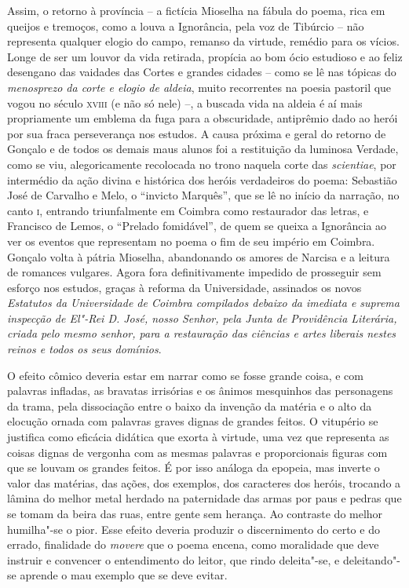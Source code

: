 Assim, o retorno à província -- a fictícia Mioselha na fábula do poema, rica em
queijos e tremoços, como a louva a Ignorância, pela voz de Tibúrcio -- não
representa qualquer elogio do campo, remanso da virtude, remédio para os vícios.
Longe de ser um louvor da vida retirada, propícia ao bom ócio estudioso e ao
feliz desengano das vaidades das Cortes e grandes cidades -- como se lê nas
tópicas do \textit{menosprezo da corte e elogio de aldeia}, muito recorrentes na
poesia pastoril que vogou no século \textsc{xviii} (e não só nele) --, a buscada
vida na aldeia é aí mais propriamente um emblema da fuga para a obscuridade,
antiprêmio dado ao herói por sua fraca perseverança nos estudos. A causa próxima
e geral do retorno de Gonçalo e de todos os demais maus alunos foi a restituição
da luminosa Verdade, como se viu, alegoricamente recolocada no trono naquela
corte das \textit{scientiae}, por intermédio da ação divina e histórica dos
heróis verdadeiros do poema: Sebastião José de Carvalho e Melo, o ``invicto
Marquês'', que se lê no início da narração, no canto \textsc{i}, entrando
triunfalmente em Coimbra como restaurador das letras, e Francisco de Lemos, o
``Prelado fomidável'', de quem se queixa a Ignorância ao ver os eventos que
representam no poema o fim de seu império em Coimbra.  Gonçalo volta à pátria
Mioselha, abandonando os amores de Narcisa e a leitura de romances vulgares.
Agora fora definitivamente impedido de prosseguir sem esforço nos estudos,
graças à reforma da Universidade, assinados os novos \textit{Estatutos da
Universidade de Coimbra compilados debaixo da imediata e suprema inspecção de
El"-Rei D. José, nosso Senhor, pela Junta de Providência Literária, criada pelo
mesmo senhor, para a restauração das ciências e artes liberais nestes reinos e
todos os seus domínios}. 

O efeito cômico deveria estar em narrar como se fosse grande coisa, e com
palavras infladas, as bravatas irrisórias e os ânimos mesquinhos das personagens
da trama, pela dissociação entre o baixo da invenção da matéria e o alto da
elocução ornada com palavras graves dignas de grandes feitos.  O vitupério se
justifica como eficácia didática que exorta à virtude, uma vez que representa as
coisas dignas de vergonha com as mesmas palavras e proporcionais figuras com que
se louvam os grandes feitos. É por isso análoga da epopeia, mas inverte o valor
das matérias, das ações, dos exemplos, dos caracteres dos heróis, trocando a
lâmina do melhor metal herdado na paternidade das armas por paus e pedras que se
tomam da beira das ruas, entre gente sem herança. Ao contraste do melhor
humilha"-se o pior. Esse efeito deveria produzir o discernimento do certo e do
errado, finalidade do \textit{movere} que o poema encena, como moralidade que
deve instruir e convencer o entendimento do leitor, que rindo deleita"-se, e
deleitando"-se aprende o mau exemplo que se deve evitar.

